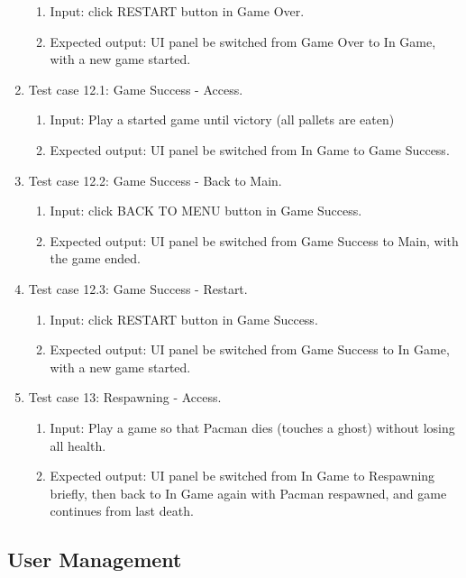 \documentclass[11pt]{article}
\begin{document}
\begin{enumerate}
        \begin{enumerate}
            \item  Input: click RESTART button in Game Over.
            \item  Expected output: UI panel be switched from Game Over to In Game, with a new game started.
        \end{enumerate}
        \item Test case 12.1: Game Success - Access.
        \begin{enumerate}
            \item  Input: Play a started game until victory (all pallets are eaten)
            \item  Expected output: UI panel be switched from In Game to Game Success.
        \end{enumerate}
        \item Test case 12.2: Game Success - Back to Main.
        \begin{enumerate}
            \item  Input: click BACK TO MENU button in Game Success.
            \item  Expected output: UI panel be switched from Game Success to Main, with the game ended.
        \end{enumerate}
        \item Test case 12.3: Game Success - Restart.
        \begin{enumerate}
            \item  Input: click RESTART button in Game Success.
            \item  Expected output: UI panel be switched from Game Success to In Game, with a new game started.
        \end{enumerate}
        \item Test case 13: Respawning - Access.
        \begin{enumerate}
            \item  Input: Play a game so that Pacman dies (touches a ghost) without losing all health.
            \item  Expected output: UI panel be switched from In Game to Respawning briefly, then back to In Game again with Pacman respawned, and game continues from last death.
        \end{enumerate}
    \end{enumerate}
    

    \subsection{User Management}
\end{document}
